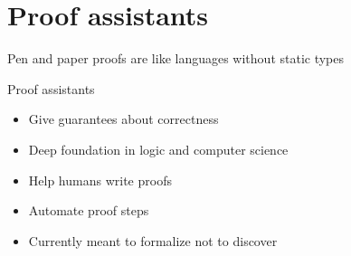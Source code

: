\documentclass[compress,12pt,xcolor={dvipsnames}]{beamer}
\begin{document}




\section{Proof assistants}

\begin{frame}[standout]
    \centering\large
    Pen and paper proofs are like languages without static types
\end{frame}

\begin{frame}{Proof assistants}
    \begin{itemize}
        \item Give guarantees about correctness
        \item Deep foundation in logic and computer science
        \item Help humans write proofs
        \item Automate proof steps
        \item Currently meant to formalize not to discover
    \end{itemize}
\end{frame}
\end{document}

